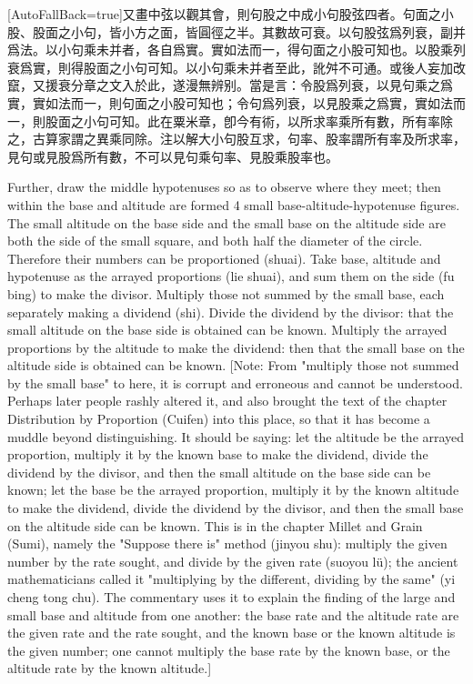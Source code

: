 \documentclass[11pt]{article}
\newcommand{\zhsmall}{\footnotesize\color{black!70}}
\newcommand{\unitlabel}[1]{\marginpar{\raggedleft\tiny\color{gray}#1}}
\newenvironment{unitzh}{\par\CJKfontspec{Noto Serif CJK SC}[AutoFallBack=true]\large\linespread{1.25}\selectfont}{\par}
\newenvironment{uniten}{\par\small\color{black!85}}{\par\medskip}
\begin{document}
\begin{unitzh}\unitlabel{jiuzhang-042.5}又畫中弦以觀其會，則句股之中成小句股弦四者。句面之小股、股面之小句，皆小方之面，皆圓徑之半。其數故可衰。以句股弦爲列衰，副并爲法。以小句乘未并者，各自爲實。實如法而一，得句面之小股可知也。以股乘列衰爲實，則得股面之小句可知。{\zhsmall 以小句乘未并者至此，訛舛不可通。或後人妄加改竄，又援衰分章之文入於此，遂漫無辨别。當是言：令股爲列衰，以見句乘之爲實，實如法而一，則句面之小股可知也；令句爲列衰，以見股乘之爲實，實如法而一，則股面之小句可知。此在粟米章，卽今有術，以所求率乘所有數，所有率除之，古算家謂之異乘同除。注以解大小句股互求，句率、股率謂所有率及所求率，見句或見股爲所有數，不可以見句乘句率、見股乘股率也。}\end{unitzh}
\begin{uniten}Further, draw the middle hypotenuses so as to observe where they meet; then within the base and altitude are formed 4 small base-altitude-hypotenuse figures. The small altitude on the base side and the small base on the altitude side are both the side of the small square, and both half the diameter of the circle. Therefore their numbers can be proportioned (shuai). Take base, altitude and hypotenuse as the arrayed proportions (lie shuai), and sum them on the side (fu bing) to make the divisor. Multiply those not summed by the small base, each separately making a dividend (shi). Divide the dividend by the divisor: that the small altitude on the base side is obtained can be known. Multiply the arrayed proportions by the altitude to make the dividend: then that the small base on the altitude side is obtained can be known. [Note: From "multiply those not summed by the small base" to here, it is corrupt and erroneous and cannot be understood. Perhaps later people rashly altered it, and also brought the text of the chapter Distribution by Proportion (Cuifen) into this place, so that it has become a muddle beyond distinguishing. It should be saying: let the altitude be the arrayed proportion, multiply it by the known base to make the dividend, divide the dividend by the divisor, and then the small altitude on the base side can be known; let the base be the arrayed proportion, multiply it by the known altitude to make the dividend, divide the dividend by the divisor, and then the small base on the altitude side can be known. This is in the chapter Millet and Grain (Sumi), namely the "Suppose there is" method (jinyou shu): multiply the given number by the rate sought, and divide by the given rate (suoyou lü); the ancient mathematicians called it "multiplying by the different, dividing by the same" (yi cheng tong chu). The commentary uses it to explain the finding of the large and small base and altitude from one another: the base rate and the altitude rate are the given rate and the rate sought, and the known base or the known altitude is the given number; one cannot multiply the base rate by the known base, or the altitude rate by the known altitude.]\end{uniten}
\end{document}
